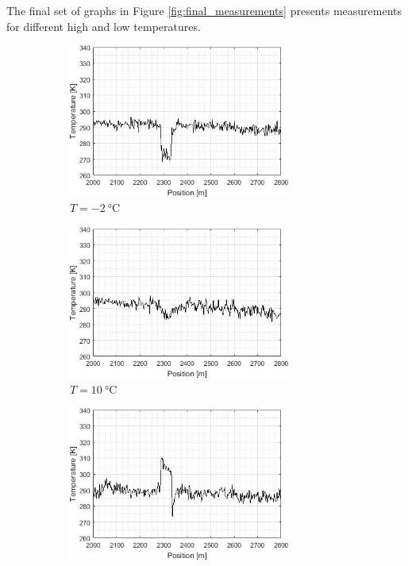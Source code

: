 \documentclass{standalone}
\begin{document}
The final set of graphs in Figure \ref{fig:final_measurements} presents measurements for different high and low temperatures.
\begin{landscape}
	\begin{figure}[h]
		\centering
		\begin{subfigure}[b]{0.49\linewidth}
			\centering
			\includegraphics[width=0.8\textwidth]{final_measurements_-2c.png}
			\caption{$T = \SI{-2}{\celsius}$}
		\end{subfigure}
		\begin{subfigure}[b]{0.49\linewidth}
			\centering
			\includegraphics[width=0.8\textwidth]{final_measurements_10c.png}
			\caption{$T = \SI{10}{\celsius}$}
		\end{subfigure}
		\begin{subfigure}[b]{0.49\linewidth}
			\centering
			\includegraphics[width=0.8\textwidth]{final_measurements_40c.png}

\end{subfigure}
\end{figure}
\end{landscape}
\end{document}
